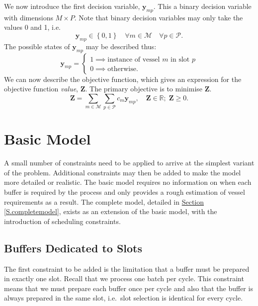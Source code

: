We now introduce the first decision variable, $\boldsymbol{y}_{mp}$.
This a binary decision variable with dimensions $M \times P$.
Note that binary decision variables may only take the values 0 and 1, i.e.
\begin{equation}
    \boldsymbol{y}_{mp} \in \left\{ 0, 1 \right\} \quad \forall m \in
    \mathcal{M} \quad \forall p \in \mathcal{P}.
    \label{eq.y}
\end{equation}
The possible states of $\boldsymbol{y}_{mp}$ may be described thus:
\begin{equation}
    \boldsymbol{y}_{mp} =
    \begin{cases}
        1 \implies \text{instance of vessel $m$ in slot $p$}\\
        0 \implies \text{otherwise.}
    \end{cases}
\end{equation}
We can now describe the objective function, which gives an expression for the
objective function \emph{value}, $\boldsymbol{Z}$.
The primary objective is to minimise $\boldsymbol{Z}$.
\begin{equation}
    \boldsymbol{Z} = \sum_{m \in \mathcal{M}} \sum_{p \in \mathcal{P}} 
    c_m \boldsymbol{y}_{mp}, \quad \boldsymbol{Z} \in \mathbb{R}; \;
    \boldsymbol{Z} \ge 0.
    \label{eq.objfn}
\end{equation}

\section{Basic Model}\label{S.basicprob}

A small number of constraints need to be applied to arrive at the simplest
variant of the problem.
Additional constraints may then be added to make the model more detailed or
realistic.
The basic model requires no information on when each buffer is required by the
process and only provides a rough estimation of vessel requirements as a
result.
The complete model, detailed in
\hyperref[S.completemodel]{Section \ref*{S.completemodel}}, exists as an
extension of the basic model, with the introduction of scheduling constraints.

\subsection{Buffers Dedicated to Slots}\label{SS.constr1}

The first constraint to be added is the limitation that a buffer must be
prepared in exactly one slot.
Recall that we process one batch per cycle.
This constraint means that we must prepare each buffer once per cycle
and also that the buffer is always prepared in the same slot, i.e.\ slot
selection is identical for every cycle.

